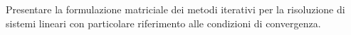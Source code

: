 Presentare la formulazione matriciale dei metodi iterativi per la risoluzione di sistemi lineari con particolare riferimento alle condizioni di convergenza. 